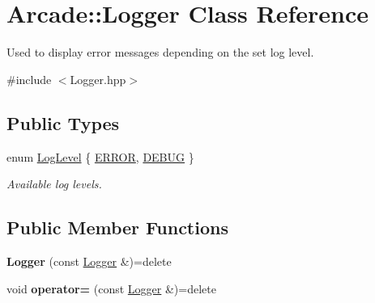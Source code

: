 \hypertarget{classArcade_1_1Logger}{}\section{Arcade\+::Logger Class Reference}
\label{classArcade_1_1Logger}


Used to display error messages depending on the set log level.  




{\ttfamily \#include $<$Logger.\+hpp$>$}

\subsection*{Public Types}
\begin{DoxyCompactItemize}
\item 
enum \mbox{\hyperlink{classArcade_1_1Logger_a9b6365ec3dfe94ac7d296ad60d4b3b20}{Log\+Level}} \{ \mbox{\hyperlink{classArcade_1_1Logger_a9b6365ec3dfe94ac7d296ad60d4b3b20a7dc500efbea520e3cf58551c7c76d694}{E\+R\+R\+OR}}, 
\mbox{\hyperlink{classArcade_1_1Logger_a9b6365ec3dfe94ac7d296ad60d4b3b20a2df55fe7b387ec1cdb7a780e6a95bbbc}{D\+E\+B\+UG}}
 \}
\begin{DoxyCompactList}\small\item\em Available log levels. \end{DoxyCompactList}\end{DoxyCompactItemize}
\subsection*{Public Member Functions}
\begin{DoxyCompactItemize}
\item 
\mbox{\label{classArcade_1_1Logger_ad7812e041fb9b956cd36ad2013c9bda6}} 
{\bfseries Logger} (const \mbox{\hyperlink{classArcade_1_1Logger}{Logger}} \&)=delete
\item 
\mbox{\label{classArcade_1_1Logger_a78f01aa85df4d75249b1cc62678c0b1a}} 
void {\bfseries operator=} (const \mbox{\hyperlink{classArcade_1_1Logger}{Logger}} \&)=delete
\end{DoxyCompactItemize}

